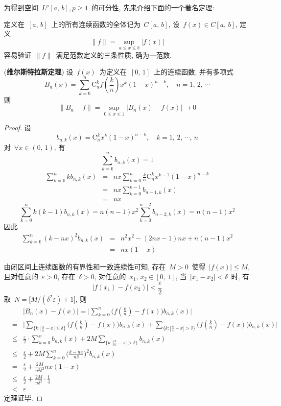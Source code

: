 为得到空间~$L^p[a,\,b], p\geqslant 1$~的可分性, 先来介绍下面的一个著名定理:

\smallskip

定义在~$[a,\,b]$~上的所有连续函数的全体记为~$C[a,\,b]$, 设~$f(x)\in C[a,\,b]$, 定义
\[
\|f\|=\sup_{a\leqslant x\leqslant b}|f(x)|
\]
容易验证~$\|f\|$~满足范数定义的三条性质, 确为一范数.

\begin{Theorem}(\textbf{维尔斯特拉斯定理})
设~$f(x)$~为定义在~$[0,\,1]$~上的连续函数, 并有多项式
\[
B_{n}(x)=\sum_{k=0}^{n}\mathrm{C}_{n}^{k}f(\frac{k}{n})x^{k}(1-x)^{n-k},\quad n=1,\,2,\,\cdots
\]
则
\[
\|B_{n}-f\|=\sup_{0\leqslant  x\leqslant 1}|B_{n}(x)-f(x)| \longrightarrow 0
\]
\end{Theorem}

\begin{proof}
设
\[
b_{n,k}(x)=\mathrm{C}_{n}^{k}x^{k}(1-x)^{n-k},\quad k=1,\,2,\,\cdots, \,n
\]
对~$\forall x\in (0,\,1)$, 有
\[
\sum_{k=0}^{n}b_{n,k}(x)=1
\]
\begin{eqnarray*}
\sum_{k=0}^{n}k b_{n,k}(x)&=& nx\sum_{k=0}^{n}\frac{k}{n}\mathrm{C}_{n}^{k}x^{k-1}(1-x)^{n-k}\\
&=& nx\sum_{k=0}^{n-1}b_{n-1,k}(x)\\
&=& n x
\end{eqnarray*}
\[
\sum_{k=0}^{n}k(k-1) b_{n,k}(x)=n(n-1)x^{2}\sum_{k=0}^{n-2}b_{n-2,k}(x)=n(n-1)x^{2}
\]
因此
\begin{eqnarray*}
\sum_{k=0}^{n}(k-n x)^{2} b_{n,k}(x)&=& n^{2}x^{2}-(2nx-1)nx+n(n-1)x^{2}\\
&=& n x(1-x)
\end{eqnarray*}

由闭区间上连续函数的有界性和一致连续性可知, 存在~$M>0$~使得~$|f(x)|\leqslant M$, 且对任意的~$\varepsilon>0$, 存在~$\delta>0$, 对任意的~$x_{1},\, x_{2}\in [0,\,1]$,
当~$|x_{1}-x_{2}|<\delta$~时, 有
\[
|f(x_{1})-f(x_{2})|<\frac{\varepsilon}{2}
\]
取~$N=\big[M/(\delta^2\varepsilon)+1\big]$, 则
\begin{eqnarray*}
&&\big|B_{n}(x)-f(x)\big|= \Big|\sum_{k=0}^{n}\Big(f(\frac{k}{n})-f(x)\Big) b_{n,k}(x)\Big| \\
&=& \bigg|\sum_{\{k: |\frac{k}{n}-x|\leqslant \delta\}}\Big(f(\frac{k}{n})-f(x)\Big) b_{n,k}(x)+\sum_{\{k: |\frac{k}{n}-x|> \delta\}}\Big(f(\frac{k}{n})-f(x)\Big) b_{n,k}(x)\bigg|\\
&\leqslant& \frac{\varepsilon}{2}\cdot\sum_{k=0}^{n} b_{n,k}(x)+2M\sum_{\{k: |\frac{k}{n}-x|> \delta\}} b_{n,k}(x)\\
&\leqslant& \frac{\varepsilon}{2}+2M\sum_{k=0}^{n}\Big(\frac{k-n x}{n\delta}\Big)^{2}b_{n,k}(x)\\
&=& \frac{\varepsilon}{2}+\frac{2M}{n^{2}\delta^{2}}n x(1-x)\\
&\leqslant& \frac{\varepsilon}{2}+\frac{2M}{n\delta^{2}}\cdot\frac{1}{4} \\
&<&\varepsilon
\end{eqnarray*}
定理证毕.
\end{proof}

